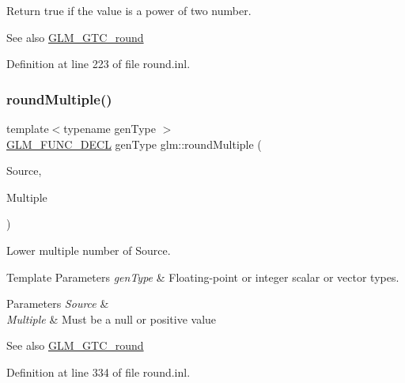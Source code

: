 Return true if the value is a power of two number.

\begin{DoxySeeAlso}{See also}
\mbox{\hyperlink{group__gtc__round}{G\+L\+M\+\_\+\+G\+T\+C\+\_\+round}} 
\end{DoxySeeAlso}


Definition at line 223 of file round.\+inl.

\mbox{\label{group__gtc__round_ga6739d1de04b2cea7c78675b365644bce}} 
\subsubsection{\texorpdfstring{roundMultiple()}{roundMultiple()}\hspace{0.1cm}{\footnotesize\ttfamily [1/2]}}
{\footnotesize\ttfamily template$<$typename gen\+Type $>$ \\
\mbox{\hyperlink{setup_8hpp_ab2d052de21a70539923e9bcbf6e83a51}{G\+L\+M\+\_\+\+F\+U\+N\+C\+\_\+\+D\+E\+CL}} gen\+Type glm\+::round\+Multiple (\begin{DoxyParamCaption}\item[{gen\+Type}]{Source,  }\item[{gen\+Type}]{Multiple }\end{DoxyParamCaption})}

Lower multiple number of Source.


\begin{DoxyTemplParams}{Template Parameters}
{\em gen\+Type} & Floating-\/point or integer scalar or vector types. \\
\hline
\end{DoxyTemplParams}

\begin{DoxyParams}{Parameters}
{\em Source} & \\
\hline
{\em Multiple} & Must be a null or positive value\\
\hline
\end{DoxyParams}
\begin{DoxySeeAlso}{See also}
\mbox{\hyperlink{group__gtc__round}{G\+L\+M\+\_\+\+G\+T\+C\+\_\+round}} 
\end{DoxySeeAlso}


Definition at line 334 of file round.\+inl.

\mbox{\label{group__gtc__round_ga10a8ab7b254257b607b6a3fc68c3e661}} 
